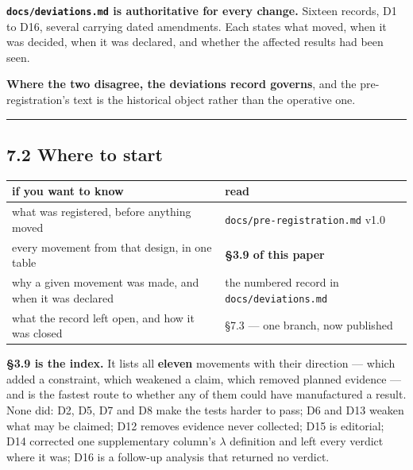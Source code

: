\documentclass[
  10pt,
]{article}
\newcounter{none} %
\begin{document}
\textbf{\texttt{docs/\allowbreak{}deviations.md} is authoritative for every change.}
Sixteen records, D1 to D16, several carrying dated amendments. Each
states what moved, when it was decided, when it was declared, and
whether the affected results had been seen.

\textbf{Where the two disagree, the deviations record governs}, and the
pre-registration's text is the historical object rather than the
operative one.

\begin{center}\rule{0.5\linewidth}{0.5pt}\end{center}

\subsection{7.2 Where to start}\label{where-to-start}

{\def\LTcaptype{none} %
\begin{longtable}[]{@{}
  >{\raggedright\arraybackslash}p{}
  >{\raggedright\arraybackslash}p{}@{}}
\toprule\noalign{}
\begin{minipage}[b]{\linewidth}\raggedright
if you want to know
\end{minipage} & \begin{minipage}[b]{\linewidth}\raggedright
read
\end{minipage} \\
\midrule\noalign{}
\endhead
\bottomrule\noalign{}
\endlastfoot
what was registered, before anything moved &
\texttt{docs/\allowbreak{}pre-registration.md} v1.0 \\
every movement from that design, in one table & \textbf{\S{}3.9 of this
paper} \\
why a given movement was made, and when it was declared & the numbered
record in \texttt{docs/\allowbreak{}deviations.md} \\
what the record left open, and how it was closed & \S{}7.3 --- one
branch, now published \\
\end{longtable}
}

\textbf{\S{}3.9 is the index.} It lists all \textbf{eleven} movements
with their direction --- which added a constraint, which weakened a
claim, which removed planned evidence --- and is the fastest route to
whether any of them could have manufactured a result. None did: D2, D5,
D7 and D8 make the tests harder to pass; D6 and D13 weaken what may be
claimed; D12 removes evidence never collected; D15 is editorial; D14
corrected one supplementary column's \(\lambda\) definition and left
every verdict where it was; D16 is a follow-up analysis that returned no
verdict.
\end{document}
